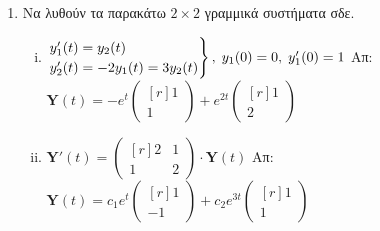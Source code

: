 


\pagestyle{askhseis}



\begin{center}
  \minibox{\large \bfseries \textcolor{Col1}{Ασκήσεις στα Γραμμικά Συστήματα ΣΔΕ
  (Ομογενή)}}
\end{center}

\vspace{\baselineskip}


\begin{enumerate}

  \item Να λυθούν τα παρακάτω $ 2 \times 2 $ γραμμικά συστήματα σδε.

    \begin{enumerate}[i)]


      \item $ \left.
          \renewcommand{\arraystretch}{1.2}
          \begin{matrix*}[l]
            y_{1}'(t) = y_{2}(t) \\
            y_{2}'(t) = -2 y_{1}(t) = 3 y_{2}(t)
          \end{matrix*}
        \right\}, \; y_{1}(0)=0, \; y_{1}'(0)=1 $ 
        \hfill Απ: {\scriptsize $ \mathbf{Y}(t) = - e^{t} 
          \begin{pmatrix*}[r] 1 \\ 1 \end{pmatrix*} + e^{2t} 
        \begin{pmatrix*}[r] 1 \\ 2 \end{pmatrix*} $} 

      \item $ \mathbf{Y}'(t) = 
        \begin{pmatrix*}[r]
          2 & 1 \\
          1 & 2
        \end{pmatrix*} \cdot 
        \mathbf{Y}(t) $
        \hfill Απ: {\scriptsize $ \mathbf{Y}(t) = c_{1}e^{t} 
          \begin{pmatrix*}[r] 1 \\ -1 \end{pmatrix*} + c_{2}e^{3t} 
        \begin{pmatrix*}[r] 1 \\ 1 \end{pmatrix*} $} 


\end{enumerate}
\end{enumerate}
